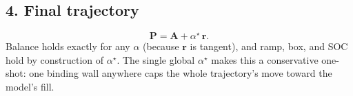 \documentclass{article}
\begin{document}
\subsection*{4. Final trajectory}
\begin{equation}
    \mathbf{P}=\mathbf{A}+\alpha^\star\,\mathbf{r}.
\end{equation}
Balance holds exactly for any $\alpha$ (because $\mathbf{r}$ is tangent), and
ramp, box, and SOC hold by construction of $\alpha^\star$. The single global
$\alpha^\star$ makes this a conservative one-shot: one binding wall anywhere caps
the whole trajectory's move toward the model's fill.
\end{document}
